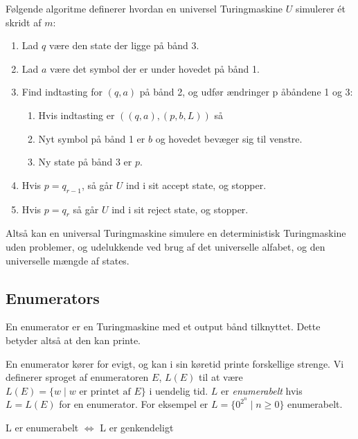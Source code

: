 Følgende algoritme definerer hvordan en universel Turingmaskine $U$ simulerer ét skridt af $m$:
\begin{enumerate}
  \item Lad $q$ være den state der ligge på bånd 3.
  \item Lad $a$ være det symbol der er under hovedet på bånd 1.
  \item Find indtasting for $(q,a)$ på bånd 2, og udfør ændringer p åbåndene 1 og 3:
		\begin{enumerate}
		  \item Hvis indtasting  er $((q,a),(p,b,L))$ så
		  \item Nyt symbol på bånd 1 er $b$ og hovedet bevæger sig til venstre.
		  \item Ny state på bånd 3 er $p$.
		\end{enumerate}
  \item Hvis $p = q_{r-1}$, så går $U$ ind i sit accept state, og stopper.
  \item Hvis $p = q_{r}$ så går $U$ ind i sit reject state, og stopper.
\end{enumerate}

Altså kan en universal Turingmaskine simulere en deterministisk Turingmaskine uden problemer, og udelukkende ved brug af det universelle alfabet, og den universelle mængde af states.

\subsection{Enumerators}%
\label{subsec:enumerators}

En enumerator er en Turingmaskine med et output bånd tilknyttet. Dette betyder altså at den kan printe.

En enumerator kører for evigt, og kan i sin køretid printe forskellige strenge. Vi definerer sproget af enumeratoren $E$, $L(E)$ til at være $L(E) = \{w \mid w \text{ er printet af }E\}$ i uendelig tid. $L$ er \textit{enumerabelt}  hvis $L = L(E)$ for en enumerator. For eksempel er $L = \{0^{2^{n}} \mid n \ge 0\}$ enumerabelt.

\begin{theorem}
L er enumerabelt  $\iff$ L er genkendeligt
\end{theorem}


